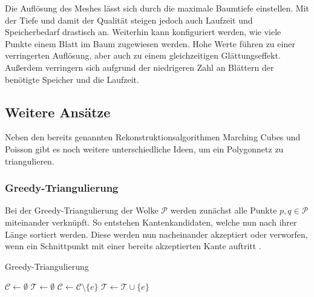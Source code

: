 Die Auflösung des Meshes lässt sich durch die maximale Baumtiefe einstellen.
Mit der Tiefe und damit der Qualität steigen jedoch auch Laufzeit und Speicherbedarf drastisch an.
Weiterhin kann konfiguriert werden, wie viele Punkte einem Blatt im Baum zugewiesen werden.
Hohe Werte führen zu einer verringerten Auflösung, aber auch zu einem gleichzeitigen Glättungseffekt.
Außerdem verringern sich aufgrund der niedrigeren Zahl an Blättern der benötigte Speicher und die Laufzeit.


\subsection{Weitere Ansätze}
\label{subsec:triangulation-others}

Neben den bereits genannten Rekonstruktionsalgorithmen Marching Cubes und Poisson gibt es noch weitere unterschiedliche Ideen, um ein Polygonnetz zu triangulieren.

\subsubsection{Greedy-Triangulierung}
\label{subsubsec:greedy-triangulierung}

Bei der Greedy-Triangulierung der Wolke $\mathcal{P}$ werden zunächst alle Punkte $p, q \in \mathcal{P}$ miteinander verknüpft.
So entstehen Kantenkandidaten, welche nun nach ihrer Länge sortiert werden.
Diese werden nun nacheinander akzeptiert oder verworfen, wenn ein Schnittpunkt mit einer bereits akzeptierten Kante auftritt \cite[235--237]{preparata1985computational}.

\begin{algorithm}[H]
\caption{Greedy-Triangulierung}
\label{alg:greedy-triangulierung}
\begin{algorithmic}
\State $\mathcal{C} \gets \emptyset$
	\State {}
\EndFor
\State {}
\State $\mathcal{T} \gets \emptyset$
			\State $\mathcal{C} \gets \mathcal{C} \setminus \{e\}$
		\EndIf
	\EndFor
	\State $\mathcal{T} \gets \mathcal{T} \cup \{e\}$
\EndFor
\State {}
\end{algorithmic}
\end{algorithm}

